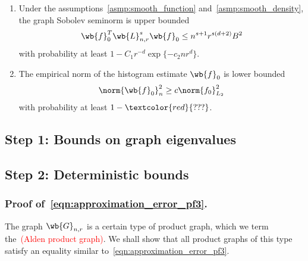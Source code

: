 \documentclass{article}
\newcommand{\1}{\mathbf{1}}
\newcommand{\Leb}{L}
\theoremstyle{alden}
\theoremstyle{aldenthm}
\theoremstyle{definition}
\theoremstyle{remark}
\begin{document}
\begin{enumerate}
	\item Under the assumptions~\ref{asmp:smooth_function} and~\ref{asmp:smooth_density}, the graph Sobolev seminorm is upper bounded
	\begin{equation*}
	\wb{f}_0^T \wb{L}_{n,r}^s \wb{f}_0 \leq n^{s + 1}r^{s(d + 2)} B^2
	\end{equation*}
	with probability at least $1 - C_1 r^{-d} \exp\{-c_2 nr^d\}$.
	\item The empirical norm of the histogram estimate $\wb{f}_0$ is lower bounded
	\begin{equation*}
	\norm{\wb{f}_0}_n^2 \geq c \norm{f_0}_{\Leb_2}^2
	\end{equation*}
	with probability at least $1 - \textcolor{red}{???}$.
\end{enumerate}

\subsection{Step 1: Bounds on graph eigenvalues}

\subsection{Step 2: Deterministic bounds}

\subsubsection{Proof of~\eqref{eqn:approximation_error_pf3}.}
The graph $\wb{G}_{n,r}$ is a certain type of product graph, which we term the~\textcolor{red}{(Alden product graph)}. We shall show that all product graphs of this type satisfy an equality similar to~\eqref{eqn:approximation_error_pf3}.
\end{document}

